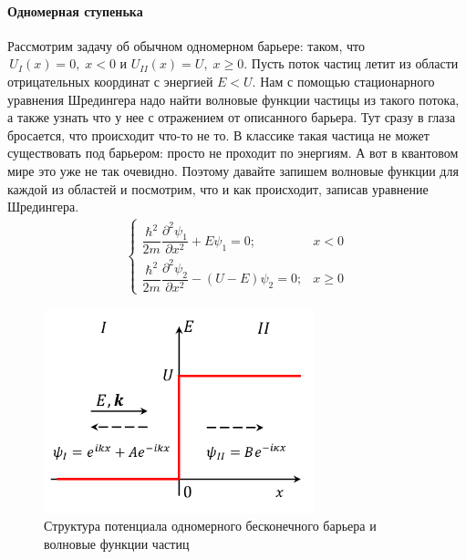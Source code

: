 \documentclass[12pt]{article}
\begin{document}
\paragraph{Одномерная ступенька}
Рассмотрим задачу об обычном одномерном барьере: таком, что $\,U_I(x) = 0,\; x<0$ и $U_{II}(x) = U,\; x \geqslant 0$. Пусть поток частиц летит из области отрицательных координат с энергией $E<U$. Нам с помощью стационарного уравнения Шредингера надо найти волновые функции частицы из такого потока, а также узнать что у нее с отражением от описанного барьера. Тут сразу в глаза бросается, что происходит что-то не то. В классике такая частица не может существовать под барьером: просто не проходит по энергиям. А вот в квантовом мире это уже не так очевидно. Поэтому давайте запишем волновые функции для каждой из областей и посмотрим, что и как происходит, записав уравнение Шредингера.
\begin{gather*}
    \begin{cases}
         \dfrac{\hbar^2}{2m}\dfrac{\partial^2\psi_1}{\partial x^2} +  E\psi_1=0; &x<0  \\[10pt]
         \dfrac{\hbar^2}{2m}\dfrac{\partial^2\psi_2}{\partial x^2} - (U - E)\psi_2=0; &x \ge 0
    \end{cases}
\end{gather*}
\begin{figure}[h]
    \centering
    \includegraphics[width=0.7\textwidth,height=\textheight,keepaspectratio]{Seminar_04/pics/pic_01.pdf}
    \caption{Структура потенциала одномерного бесконечного барьера и волновые функции частиц}
    \label{fig:sem_04}
\end{figure}
\end{document}
